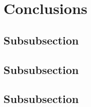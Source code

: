 \section{Conclusions}
\label{sec61}


\lipsum[1]

\subsection{Subsubsection}
\label{sec611}

\lipsum[1]

\subsection{Subsubsection}
\label{sec612}

\lipsum[1]

\subsection{Subsubsection}
\label{sec613}

\lipsum[1]

